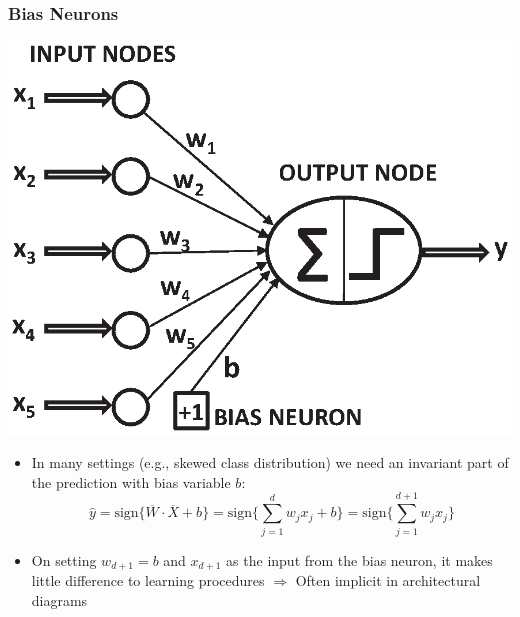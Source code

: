 \documentclass[aspectratio=169,mathserif]{beamer}
\begin{document}
\begin{frame}
\frametitle{Bias Neurons}
\begin{center}
\includegraphics[scale=0.4]{neuralbiasa.eps}
\end{center}
\begin{itemize}
\item  In many settings (e.g., skewed class distribution) we need an
invariant part of the prediction with bias variable $b$:
\begin{equation*}
\hat{y}= \mbox{sign}\{ \overline{W}\cdot \overline{X} +b \} =
\mbox{sign}\{ \sum_{j=1}^d w_j x_j  + b  \} = \mbox{sign}\{
\sum_{j=1}^{d+1} w_j x_j    \}
\end{equation*}
\item On setting $w_{d+1}=b$ and $x_{d+1}$ as the input from the
bias neuron, it makes little difference to learning procedures
$\Rightarrow$ Often implicit in architectural diagrams
\end{itemize}
\end{frame}
\end{document}
